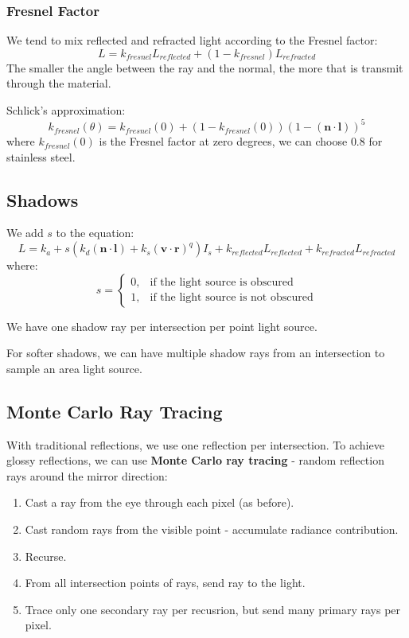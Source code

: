 \documentclass[11pt]{article}
\begin{document}
\subsubsection{Fresnel Factor}
We tend to mix reflected and refracted light according to the Fresnel factor:
\[
  L = k_{fresnel} L_{reflected} + (1 - k_{fresnel}) L_{refracted} 
\]
The smaller the angle between the ray and the normal, the more that is transmit through the material.

Schlick's approximation:
\[
  k_{fresnel} (\theta) = k_{fresnel} (0) + (1 - k_{fresnel}(0)) (1 - (\textbf{n} \cdot \textbf{l}))^5
\]
where $k_{fresnel}(0)$ is the Fresnel factor at zero degrees, we can choose $0.8$ for stainless steel.

\subsection{Shadows}
We add $s$ to the equation:
\[
  L = k_a + s(k_d (\textbf{n} \cdot \textbf{l}) + k_s(\textbf{v} \cdot \textbf{r})^q)I_s + k_{reflected} L_{reflected} + k_{refracted}L_{refracted}
\]
where:
\[
  s =
  \begin{cases}
    0, & \text{if the light source is obscured} \\
    1, & \text{if the light source is not obscured}
  \end{cases}
\]

We have one shadow ray per intersection per point light source.

For softer shadows, we can have multiple shadow rays from an intersection to sample an area light source.

\subsection{Monte Carlo Ray Tracing}
With traditional reflections, we use one reflection per intersection.
To achieve glossy reflections, we can use \textbf{Monte Carlo ray tracing} - random reflection rays around the mirror direction:
\begin{enumerate}
  \item Cast a ray from the eye through each pixel (as before).
  \item Cast random rays from the visible point - accumulate radiance contribution.
  \item Recurse.
  \item From all intersection points of rays, send ray to the light.
  \item Trace only one secondary ray per recusrion, but send many primary rays per pixel.
\end{enumerate}
\end{document}
